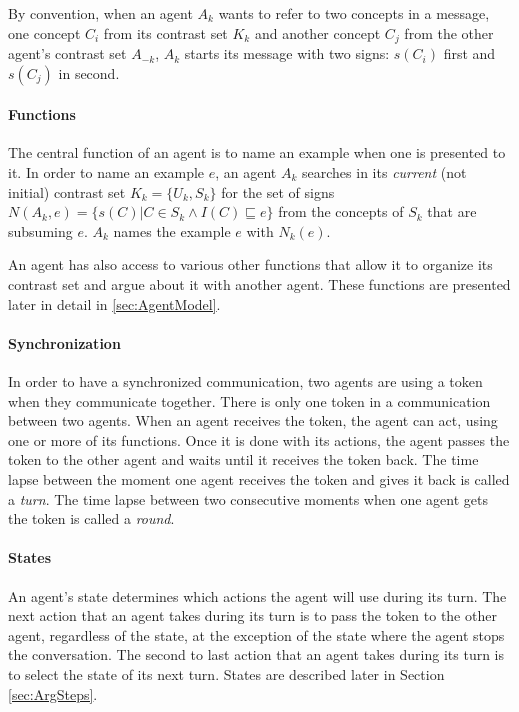 By convention, when an agent $A_{k}$ wants to refer to two concepts in a message, one concept $C_{i}$ from its contrast set $K_{k}$ and another concept $C_{j}$ from the other agent's contrast set $A_{-k}$, $A_{k}$ starts its message with two signs: $s(C_{i})$ first and $s(C_{j})$ in second.

\paragraph{Functions}

The central function of an agent is to name an example when one is presented to it. In order to name an example $e$, an agent $A_{k}$ searches in its \emph{current} (not initial) contrast set $K_{k} = \{ U_{k}, S_{k} \}$ for the set of signs $N(A_{k},e) = \{ s(C) | C \in S_k \wedge I(C) \sqsubseteq e\}$ from the concepts of $S_{k}$ that are subsuming $e$. $A_{k}$ names the example $e$ with $N_{k}(e)$.

An agent has also access to various other functions that allow it to organize its contrast set and argue about it with another agent. These functions are presented later in detail in \ref{sec:AgentModel}.

\paragraph{Synchronization}

In order to have a synchronized communication, two agents are using a token when they communicate together. There is only one token in a communication between two agents. When an agent receives the token, the agent can act, using one or more of its functions. Once it is done with its actions, the agent passes the token to the other agent and waits until it receives the token back. The time lapse between the moment one agent receives the token and gives it back is called a \emph{turn}. The time lapse between two consecutive moments when one agent gets the token is called a \emph{round}.

\paragraph{States}

An agent's state determines which actions the agent will use during its turn. The next action that an agent takes during its turn is to pass the token to the other agent, regardless of the state, at the exception of the state where the agent stops the conversation. The second to last action that an agent takes during its turn is to select the state of its next turn. States are described later in Section \ref{sec:ArgSteps}.

